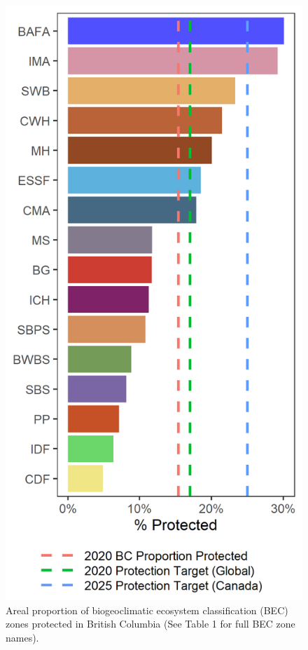 \documentclass[10pt,oneside]{article}
\makeatletter
\def\maxwidth{\ifdim\Gin@nat@width>\linewidth\linewidth
\else\Gin@nat@width\fi}
\let\Oldincludegraphics\includegraphics
\renewcommand{\includegraphics}[1]{\Oldincludegraphics[width=\maxwidth]{#1}}
\makeatother
\begin{document}
\begin{figure}
\hypertarget{fig:bec-conch}{%
\centering
\includegraphics{figures/bec_bar.png}
\caption{Areal proportion of biogeoclimatic ecosystem classification
(BEC) zones protected in British Columbia (See Table 1 for full BEC zone
names).}\label{fig:bec-conch}
}
\end{figure}
\end{document}

